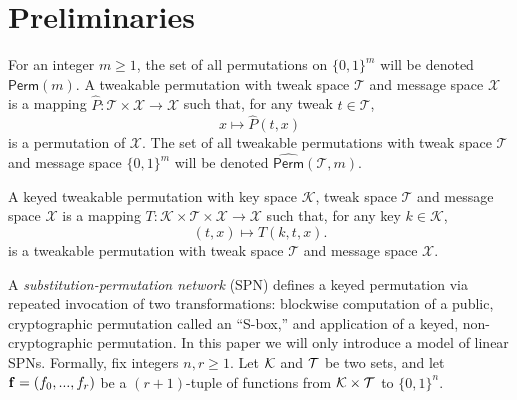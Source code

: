 

\section{Preliminaries}
\label{sec:preliminary}

For an integer $m\geq1$, the set of all permutations on $\{0, 1\}^m$ will be denoted $\textsf{Perm}(m)$. A tweakable permutation with tweak space
$\mathcal{T}$ and message space $\mathcal{X}$ is a mapping $\widehat{P}:\mathcal{T}\times\mathcal{X}\rightarrow\mathcal{X}$ such that, for any tweak
$t\in\mathcal{T}$,
%
$$x\mapsto\widehat{P}(t,x)$$
%
is a permutation of $\mathcal{X}$. The set of all tweakable permutations with tweak space
$\mathcal{T}$ and message space $\{0, 1\}^m$ will be denoted $\widehat{\textsf{Perm}}(\mathcal{T},m)$.




\arrangespace


{}
%
A keyed tweakable permutation with key space $\mathcal{K}$, tweak space $\mathcal{T}$ and message
space $\mathcal{X}$ is a mapping $T:\mathcal{K}\times\mathcal{T}\times\mathcal{X}\rightarrow\mathcal{X}$ such that, for any key $k\in\mathcal{K}$,
%
$$(t,x)\mapsto T(k,t,x).$$
%
is a tweakable permutation with tweak space $\mathcal{T}$ and message space $\mathcal{X}$.



\arrangespace
{}
%
A \emph{substitution-permutation network} (SPN) defines a keyed permutation via repeated invocation of two transformations: blockwise computation of a public, cryptographic permutation called an ``S-box,'' and application of a keyed, non-cryptographic permutation. In this paper we will only introduce a model of linear SPNs. Formally, fix integers $n,r\geq1$. Let $\mathcal{K}$ and $\mathcal{T}$ be two
sets, and let $\mathbf{f}= (f_0,...,f_r)$ be a $(r+1)$-tuple of functions from $\mathcal{K}\times\mathcal{T}$ to $\{0, 1\}^n$.





